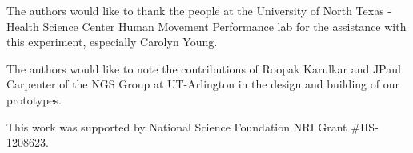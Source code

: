\documentclass[twocolumn]{sagej}
\begin{document}
\begin{acks}
\label{sec:acknowledgments}
The authors would like to thank the people at the University of North Texas - Health Science Center Human Movement Performance lab for the assistance with this experiment, especially Carolyn Young.  \par 
The authors would like to note the contributions of Roopak Karulkar and JPaul Carpenter of the NGS Group at UT-Arlington in the design and building of our prototypes.
\end{acks}

\begin{funding}
This work was supported by National Science Foundation NRI Grant $\#$IIS-1208623.
\end{funding}



%
%


\end{document}

